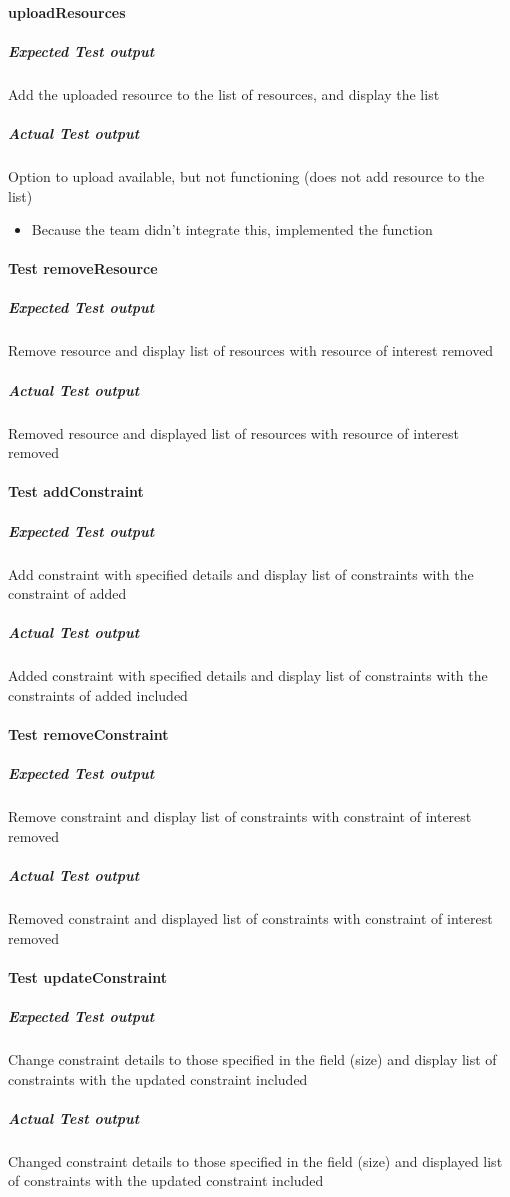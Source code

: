 
\paragraph{uploadResources}
	\subparagraph{Expected Test output}
	Add the uploaded resource to the list of resources, and display the list
	
	\subparagraph{Actual Test output}
	Option to upload available, but not functioning (does not add resource to the list) 
		\begin{itemize}
			\item Because the team didn't integrate this, implemented the function
		\end{itemize}
		
\paragraph{Test removeResource}
	\subparagraph{Expected Test output}
	Remove resource and display list of resources with resource of interest removed
	
	\subparagraph{Actual Test output}
	Removed resource and displayed list of resources with resource of interest removed
	
\paragraph{Test addConstraint}
	\subparagraph{Expected Test output}
	Add constraint with specified details and display list of constraints with the constraint of added 
	
	\subparagraph{Actual Test output}
	Added constraint with specified details and display list of constraints with the constraints of added included
	
\paragraph{Test removeConstraint}
	\subparagraph{Expected Test output}
	Remove constraint and display list of constraints with constraint of interest removed
	
	\subparagraph{Actual Test output}
	Removed constraint and displayed list of constraints with constraint of interest removed
	
\paragraph{Test updateConstraint}
	\subparagraph{Expected Test output}
	Change constraint details to those specified in the field (size) and display list of constraints with the updated constraint included
	
	\subparagraph{Actual Test output}
	Changed constraint details to those specified in the field (size) and displayed list of constraints with the updated constraint included